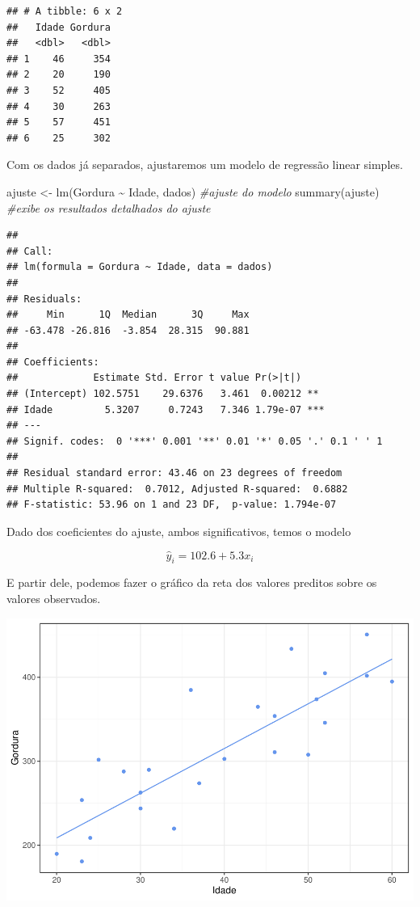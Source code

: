 \documentclass[
]{article}
\newenvironment{Shaded}{\begin{snugshade}}{\end{snugshade}}
\newcommand{\CommentTok}[1]{\textcolor[rgb]{0.56,0.35,0.01}{\textit{#1}}}
\newcommand{\FunctionTok}[1]{\textcolor[rgb]{0.00,0.00,0.00}{#1}}
\newcommand{\NormalTok}[1]{#1}
\newcommand{\OtherTok}[1]{\textcolor[rgb]{0.56,0.35,0.01}{#1}}
\newcommand{\SpecialCharTok}[1]{\textcolor[rgb]{0.00,0.00,0.00}{#1}}
\begin{document}
\begin{verbatim}
## # A tibble: 6 x 2
##   Idade Gordura
##   <dbl>   <dbl>
## 1    46     354
## 2    20     190
## 3    52     405
## 4    30     263
## 5    57     451
## 6    25     302
\end{verbatim}

Com os dados já separados, ajustaremos um modelo de regressão linear
simples.

\begin{Shaded}
\begin{Highlighting}[]
\NormalTok{ajuste }\OtherTok{\textless{}{-}} \FunctionTok{lm}\NormalTok{(Gordura }\SpecialCharTok{\textasciitilde{}}\NormalTok{ Idade, dados) }\CommentTok{\#ajuste do modelo}
\FunctionTok{summary}\NormalTok{(ajuste) }\CommentTok{\#exibe os resultados detalhados do ajuste}
\end{Highlighting}
\end{Shaded}

\begin{verbatim}
## 
## Call:
## lm(formula = Gordura ~ Idade, data = dados)
## 
## Residuals:
##     Min      1Q  Median      3Q     Max 
## -63.478 -26.816  -3.854  28.315  90.881 
## 
## Coefficients:
##             Estimate Std. Error t value Pr(>|t|)    
## (Intercept) 102.5751    29.6376   3.461  0.00212 ** 
## Idade         5.3207     0.7243   7.346 1.79e-07 ***
## ---
## Signif. codes:  0 '***' 0.001 '**' 0.01 '*' 0.05 '.' 0.1 ' ' 1
## 
## Residual standard error: 43.46 on 23 degrees of freedom
## Multiple R-squared:  0.7012, Adjusted R-squared:  0.6882 
## F-statistic: 53.96 on 1 and 23 DF,  p-value: 1.794e-07
\end{verbatim}

Dado dos coeficientes do ajuste, ambos significativos, temos o modelo

\[\hat{y}_i = 102.6 + 5.3x_i\]

E partir dele, podemos fazer o gráfico da reta dos valores preditos
sobre os valores observados.

\includegraphics{novo_files/figure-latex/unnamed-chunk-8-1.pdf}
\end{document}
